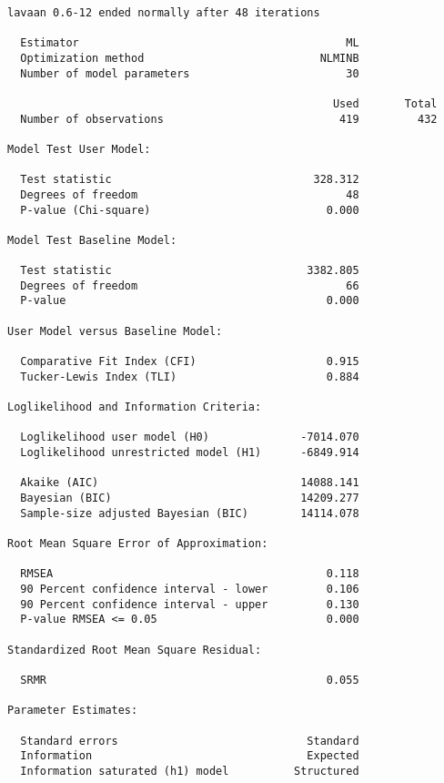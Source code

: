 \documentclass[
  letterpaper,
  DIV=11,
  numbers=noendperiod]{scrreprt}
\begin{document}
\begin{verbatim}
lavaan 0.6-12 ended normally after 48 iterations

  Estimator                                         ML
  Optimization method                           NLMINB
  Number of model parameters                        30

                                                  Used       Total
  Number of observations                           419         432

Model Test User Model:
                                                      
  Test statistic                               328.312
  Degrees of freedom                                48
  P-value (Chi-square)                           0.000

Model Test Baseline Model:

  Test statistic                              3382.805
  Degrees of freedom                                66
  P-value                                        0.000

User Model versus Baseline Model:

  Comparative Fit Index (CFI)                    0.915
  Tucker-Lewis Index (TLI)                       0.884

Loglikelihood and Information Criteria:

  Loglikelihood user model (H0)              -7014.070
  Loglikelihood unrestricted model (H1)      -6849.914
                                                      
  Akaike (AIC)                               14088.141
  Bayesian (BIC)                             14209.277
  Sample-size adjusted Bayesian (BIC)        14114.078

Root Mean Square Error of Approximation:

  RMSEA                                          0.118
  90 Percent confidence interval - lower         0.106
  90 Percent confidence interval - upper         0.130
  P-value RMSEA <= 0.05                          0.000

Standardized Root Mean Square Residual:

  SRMR                                           0.055

Parameter Estimates:

  Standard errors                             Standard
  Information                                 Expected
  Information saturated (h1) model          Structured


\end{verbatim}
\end{document}
